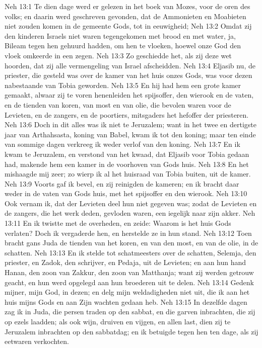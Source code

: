 Neh 13:1  Te dien dage werd er gelezen in het boek van Mozes, voor de oren des volks; en daarin werd geschreven gevonden, dat de Ammonieten en Moabieten niet zouden komen in de gemeente Gods, tot in eeuwigheid;
Neh 13:2  Omdat zij den kinderen Israels niet waren tegengekomen met brood en met water, ja, Bileam tegen hen gehuurd hadden, om hen te vloeken, hoewel onze God den vloek omkeerde in een zegen.
Neh 13:3  Zo geschiedde het, als zij deze wet hoorden, dat zij alle vermengeling van Israel afscheidden.
Neh 13:4  Eljasib nu, de priester, die gesteld was over de kamer van het huis onzes Gods, was voor dezen nabestaande van Tobia geworden.
Neh 13:5  En hij had hem een grote kamer gemaakt, alwaar zij te voren henenleiden het spijsoffer, den wierook en de vaten, en de tienden van koren, van most en van olie, die bevolen waren voor de Levieten, en de zangers, en de poortiers, mitsgaders het hefoffer der priesteren.
Neh 13:6  Doch in dit alles was ik niet te Jeruzalem; want in het twee en dertigste jaar van Arthahsasta, koning van Babel, kwam ik tot den koning; maar ten einde van sommige dagen verkreeg ik weder verlof van den koning.
Neh 13:7  En ik kwam te Jeruzalem, en verstond van het kwaad, dat Eljasib voor Tobia gedaan had, makende hem een kamer in de voorhoven van Gods huis.
Neh 13:8  En het mishaagde mij zeer; zo wierp ik al het huisraad van Tobia buiten, uit de kamer.
Neh 13:9  Voorts gaf ik bevel, en zij reinigden de kameren; en ik bracht daar weder in de vaten van Gods huis, met het spijsoffer en den wierook.
Neh 13:10  Ook vernam ik, dat der Levieten deel hun niet gegeven was; zodat de Levieten en de zangers, die het werk deden, gevloden waren, een iegelijk naar zijn akker.
Neh 13:11  En ik twistte met de overheden, en zeide: Waarom is het huis Gods verlaten? Doch ik vergaderde hen, en herstelde ze in hun stand.
Neh 13:12  Toen bracht gans Juda de tienden van het koren, en van den most, en van de olie, in de schatten.
Neh 13:13  En ik stelde tot schatmeesters over de schatten, Selemja, den priester, en Zadok, den schrijver, en Pedaja, uit de Levieten; en aan hun hand Hanan, den zoon van Zakkur, den zoon van Matthanja; want zij werden getrouw geacht, en hun werd opgelegd aan hun broederen uit te delen.
Neh 13:14  Gedenk mijner, mijn God, in dezen; en delg mijn weldadigheden niet uit, die ik aan het huis mijns Gods en aan Zijn wachten gedaan heb.
Neh 13:15  In dezelfde dagen zag ik in Juda, die persen traden op den sabbat, en die garven inbrachten, die zij op ezels laadden; als ook wijn, druiven en vijgen, en allen last, dien zij te Jeruzalem inbrachten op den sabbatdag; en ik betuigde tegen hen ten dage, als zij eetwaren verkochten.
